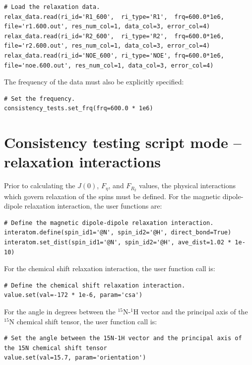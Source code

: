 \begin{lstlisting}[firstnumber=41]
# Load the relaxation data.
relax_data.read(ri_id='R1_600',  ri_type='R1',  frq=600.0*1e6, file='r1.600.out', res_num_col=1, data_col=3, error_col=4)
relax_data.read(ri_id='R2_600',  ri_type='R2',  frq=600.0*1e6, file='r2.600.out', res_num_col=1, data_col=3, error_col=4)
relax_data.read(ri_id='NOE_600', ri_type='NOE', frq=600.0*1e6, file='noe.600.out', res_num_col=1, data_col=3, error_col=4)
\end{lstlisting}

The frequency of the data must also be explicitly specified:

\begin{lstlisting}[firstnumber=62]
# Set the frequency.
consistency_tests.set_frq(frq=600.0 * 1e6)
\end{lstlisting}




\section{Consistency testing script mode -- relaxation interactions}

Prior to calculating the $J(0)$, $F_\eta$, and $F_{R_2}$ values, the physical interactions which govern relaxation of the spins must be defined.
For the magnetic dipole-dipole relaxation interaction, the user functions are:

\begin{lstlisting}[firstnumber=49]
# Define the magnetic dipole-dipole relaxation interaction.
interatom.define(spin_id1='@N', spin_id2='@H', direct_bond=True)
interatom.set_dist(spin_id1='@N', spin_id2='@H', ave_dist=1.02 * 1e-10)
\end{lstlisting}

For the chemical shift relaxation interaction, the user function call is:

\begin{lstlisting}[firstnumber=53]
# Define the chemical shift relaxation interaction.
value.set(val=-172 * 1e-6, param='csa')
\end{lstlisting}

For the angle in degrees between the $^{15}$N-$^1$H vector and the principal axis of the $^{15}$N chemical shift tensor, the user function call is:

\begin{lstlisting}[firstnumber=56]
# Set the angle between the 15N-1H vector and the principal axis of the 15N chemical shift tensor
value.set(val=15.7, param='orientation')
\end{lstlisting}


